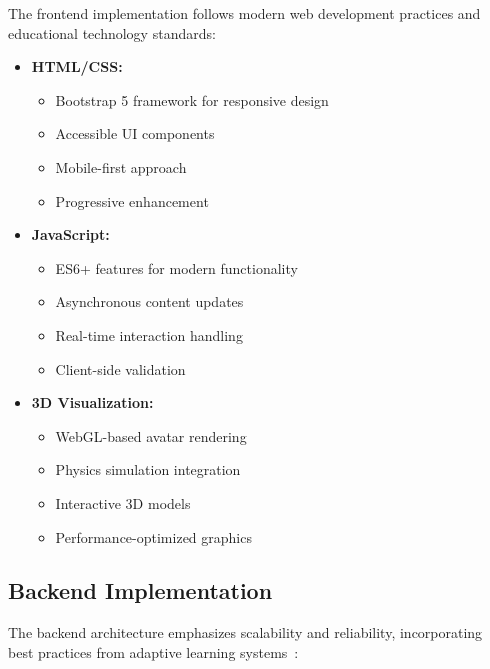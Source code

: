 The frontend implementation follows modern web development practices and educational technology standards:

\begin{itemize}
  \item \textbf{HTML/CSS:} 
    \begin{itemize}
      \item Bootstrap 5 framework for responsive design
      \item Accessible UI components
      \item Mobile-first approach
      \item Progressive enhancement
    \end{itemize}
  
  \item \textbf{JavaScript:} 
    \begin{itemize}
      \item ES6+ features for modern functionality
      \item Asynchronous content updates
      \item Real-time interaction handling
      \item Client-side validation
    \end{itemize}
  
  \item \textbf{3D Visualization:} 
    \begin{itemize}
      \item WebGL-based avatar rendering
      \item Physics simulation integration
      \item Interactive 3D models
      \item Performance-optimized graphics
    \end{itemize}
\end{itemize}

\subsection{Backend Implementation}
\label{subsec:backend}

The backend architecture emphasizes scalability and reliability, incorporating best practices from adaptive learning systems~\cite{wang2024adaptive}:

